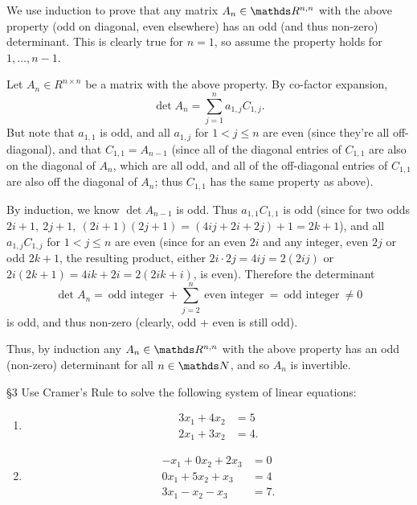 \documentclass{homework}
\begin{document}
\begin{solution}
  We use induction to prove that any matrix $A_n\in \R^{n,n}$ with the above property (odd on diagonal,
  even elsewhere) has an odd (and thus non-zero) determinant. This is clearly true for $n=1$, so
  assume the property holds for $1,\ldots,n-1$.

  Let $A_n\in R^{n\times n}$ be a matrix with the above property. By co-factor expansion, \[
      \det{A_n}=\sum_{j=1}^{n} a_{1,j}C_{1,j}
    .\] But note that $a_{1,1}$ is odd, and all $a_{1,j}$ for $1<j\le n$ are even (since they're all
    off-diagonal), and that $C_{1,1}=A_{n-1}$ (since all of the diagonal entries of $C_{1,1}$ are
    also on the diagonal of $A_{n}$, which are all odd, and all of the off-diagonal entries of
    $C_{1,1}$ are also off the diagonal of $A_n$; thus $C_{1,1}$ has the same property as above).

    By induction, we know $\det{A_{n-1}}$ is odd. Thus $a_{1,1}C_{1,1}$ is odd (since for two odds
    $2i+1,\ 2j+1,\ (2i+1)(2j+1)=(4ij+2i+2j)+1=2k+1$), and all $a_{1,j}C_{1,j}$ for $1<j\le n$ are
    even (since for an even $2i$ and any integer, even $2j$ or odd $2k+1$, the resulting product,
    either $2i\cdot 2j=4ij=2(2ij)$ or $2i(2k+1)=4ik+2i=2(2ik+i)$, is even). Therefore the
    determinant \[
      \det{A_n}=~\text{odd integer}~+\sum_{j=2}^{n} ~\text{even integer}~=~\text{odd integer}~\neq 0
    \] is odd, and thus non-zero (clearly, odd + even is still odd).

    Thus, by induction any $A_n\in \R^{n,n}$ with the above property has an odd (non-zero)
    determinant for all $n\in \N$, and so $A_n$ is invertible.
\end{solution}


\begin{problem}{\S 3}
  Use Cramer's Rule to solve the following system of linear equations:
  \begin{enumerate}[label=(\alph*)]
    \item 
      \begin{align*}
        3x_1+4x_2&= 5 \\
        2x_1+3x_2&= 4
      .\end{align*}
    \item 
      \begin{align*}
        -x_1+0x_2+2x_3&= 0 \\
        0x_1+5x_2+x_3&= 4 \\
        3x_1-x_2-x_3 &=7
      .\end{align*}
  \end{enumerate}
\end{problem}
\end{document}
